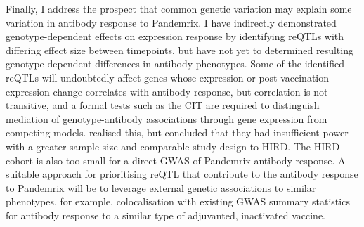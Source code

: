 
Finally, I address the prospect that common genetic variation may explain some variation in antibody response to Pandemrix.
I have indirectly demonstrated genotype-dependent effects on expression response by identifying reQTLs with differing effect size between timepoints,
but have not yet to determined resulting genotype-dependent differences in antibody phenotypes.
Some of the identified reQTLs will undoubtedly affect genes whose expression or post-vaccination expression change correlates with antibody response, 
but correlation is not transitive\autocite{langford2001PropertyBeingPositively},
and a formal tests such as the \gls{CIT}\autocite{millstein2009DisentanglingMolecularRelationships} are required to distinguish mediation of genotype-antibody associations through gene expression from competing models.
\autocite{franco2013IntegrativeGenomicAnalysis} realised this, but concluded that they had insufficient power with a greater sample size and comparable study design to \gls{HIRD}.
The \gls{HIRD} cohort is also too small for a direct \gls{GWAS} of Pandemrix antibody response.
A suitable approach for prioritising reQTL that contribute to the antibody response to Pandemrix will be to leverage external genetic associations to similar phenotypes,
for example, colocalisation with existing GWAS summary statistics for antibody response to a similar type of adjuvanted, inactivated vaccine.

